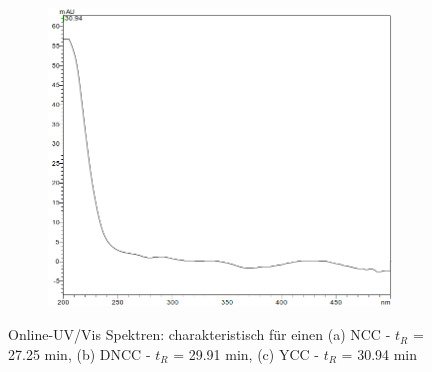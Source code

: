 \begin{figure}[!htbp]
  \begin{subfigure}[b]{0.5\textwidth}
    \includegraphics[width=\textwidth]{figures/Kapitel6/keineReaktion/YCC3094.png}
    \caption{}
    \label{fig:YCC3094}
  \end{subfigure}
  \caption[Online-UV/Vis Spektren mit der Charakteristik eines NCC bei 27.10 min, eines DNCC bei 29.75 min sowie eines YCC bei 30.94 min, Quelle: Autor]{Online-UV/Vis Spektren: charakteristisch für einen (a) \gls{NCC} - $t_R$ = 27.25 min, (b) \gls{DNCC} - $t_R$ = 29.91 min, (c) \gls{YCC} - $t_R$ = 30.94 min}
\end{figure}
